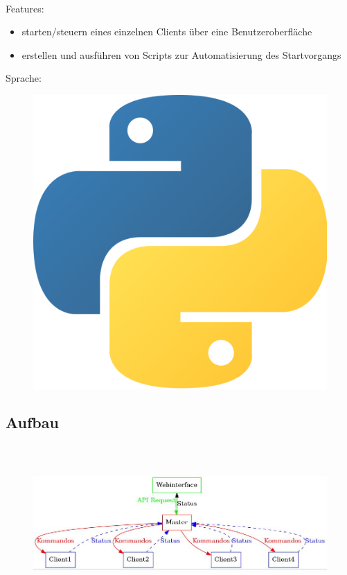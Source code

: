 \documentclass[accentcolor=tud1b,colorbacktitle,landscape,german,presentation]{tudbeamer}
\newcommand{\ftitle}{

	\frametitle{\insertsectionhead \\ {\small \insertsubsectionhead}}
}
\begin{document}
\subsection{}
\begin{frame}
	\ftitle
	Features:
	\begin{itemize}
		\item starten/steuern eines einzelnen Clients über eine Benutzeroberfläche
		\item erstellen und ausführen von Scripts zur Automatisierung des Startvorgangs
	\end{itemize}
	\vspace{0.5cm}
	Sprache:
	\begin{figure}
		\centering
		\includegraphics[scale=0.05]{python}
	\end{figure}
\end{frame}

\subsection{Aufbau}
\begin{frame}
	\ftitle
	\begin{figure}
		\includegraphics[scale=0.35]{master-client}
	\end{figure}
\end{frame}
\end{document}
